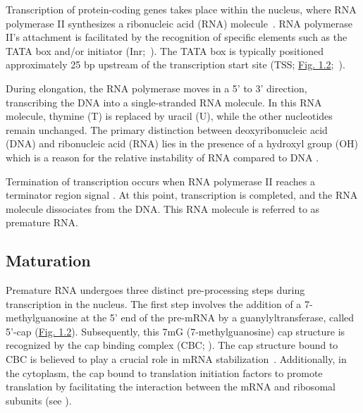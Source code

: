 Transcription of protein-coding genes takes place within the nucleus, where \acrshort{RNA} polymerase II synthesizes a ribonucleic acid (\acrshort{RNA}) molecule~\citep{nikolov_rna_1997}. \acrshort{RNA} polymerase II's attachment is facilitated by the recognition of specific elements such as the TATA box and/or initiator (Inr;~\citet{emami_mechanism_1997}). The TATA box is typically positioned approximately 25 \acrshort{bp} upstream of the transcription start site (TSS; \hyperref[fig:genestructure]{Fig. 1.2};~\citet{lifton_organization_1978}).

During elongation, the \acrshort{RNA} polymerase moves in a 5' to 3' direction, transcribing the DNA into a single-stranded RNA molecule. In this RNA molecule, thymine (\acrshort{T}) is replaced by uracil (\acrshort{U}), while the other nucleotides remain unchanged. The primary distinction between deoxyribonucleic acid (DNA) and ribonucleic acid (RNA) lies in the presence of a hydroxyl group (OH) which is a reason for the relative instability of \acrshort{RNA} compared to DNA \citep{ross_mRNA_1995, wang_origins_1995, fordyce_long-term_2013}. 

Termination of transcription occurs when \acrshort{RNA} polymerase II reaches a terminator region signal \citep{birse_transcriptional_1997, proudfoot_transcriptional_2016}. At this point, transcription is completed, and the \acrshort{RNA} molecule dissociates from the \acrshort{DNA}. This \acrshort{RNA} molecule is referred to as premature RNA.


\subsection{Maturation}

Premature \acrshort{RNA} undergoes three distinct pre-processing steps during transcription in the nucleus. The first step involves the addition of a 7-methylguanosine at the 5' end of the pre-\acrshort{mRNA} by a guanylyltransferase, called 5'-cap (\hyperref[fig:genestructure]{Fig. 1.2}). Subsequently, this 7mG (7-methylguanosine) cap structure is recognized by the cap binding complex (CBC; \citet{gonatopoulos-pournatzis_cap-binding_2014}). 
The cap structure bound to CBC is believed to play a crucial role in \acrshort{mRNA} stabilization~\citep{beelman_degradation_1995}.
Additionally, in the cytoplasm, the cap bound to translation initiation factors to promote translation by facilitating the interaction between the \acrshort{mRNA} and ribosomal subunits (see ).

